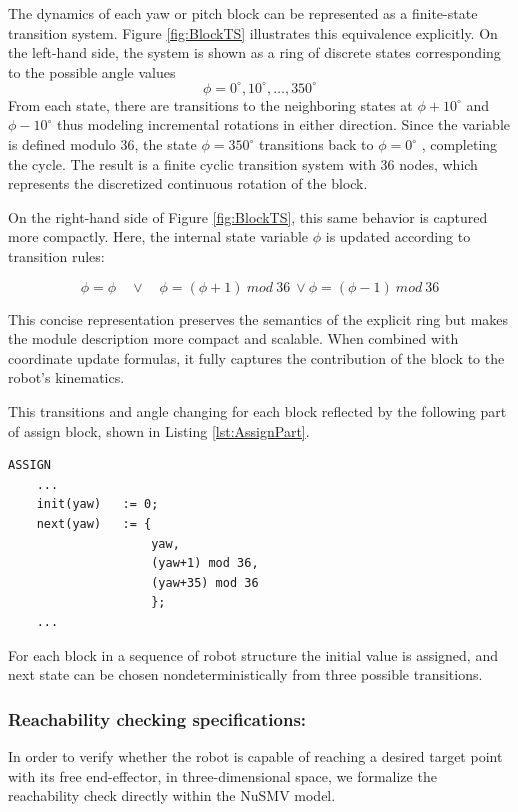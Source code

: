The dynamics of each yaw or pitch block can be represented as a finite-state transition system. 
Figure \ref{fig:BlockTS} illustrates this equivalence explicitly. 
On the left-hand side, the system is shown as a ring of discrete states 
corresponding to the possible angle values 
\[ \phi=0^\circ,10^\circ,…,350^\circ \]
From each state, there are transitions to the neighboring states at 
$ \phi+10^\circ $
 and 
 $ \phi-10^\circ $
thus modeling incremental rotations in either direction. Since the variable is defined modulo 36, the state 
$ \phi=350^\circ $
 transitions back to 
 $ \phi=0^\circ $
, completing the cycle. The result is a finite cyclic transition system with 36 nodes, 
which represents the discretized continuous rotation of the block.

On the right-hand side of Figure \ref{fig:BlockTS}, this same behavior is captured more compactly.
Here, the internal state variable $\phi$ is updated according to transition rules:

\[ \phi=\phi \quad \lor \quad \phi=(\phi+1)\ mod\ 36\ \lor \phi=(\phi-1)\ mod\ 36 \]

This concise representation preserves the semantics of the explicit ring but makes the 
module description more compact and scalable. When combined with coordinate update 
formulas, it fully captures the contribution of the block to the robot’s kinematics.

This transitions and angle changing for each block reflected by the following part  
of assign block, shown in Listing \ref{lst:AssignPart}.

\begin{lstlisting}[language=NuSMV, caption={Assign part of code for block transitions}, label={lst:AssignPart}]
ASSIGN
    ...
    init(yaw)   := 0;
    next(yaw)   := { 
                    yaw,                
                    (yaw+1) mod 36,    
                    (yaw+35) mod 36    
                    };
    ...
\end{lstlisting}
For each block in a sequence of robot structure the initial value is assigned, and next state 
can be chosen nondeterministically from three possible transitions.

\subsubsection{Reachability checking specifications:}

In order to verify whether the robot is capable of reaching a desired target point 
with its free end-effector, in three-dimensional space, we formalize the reachability 
check directly within the NuSMV model. 

